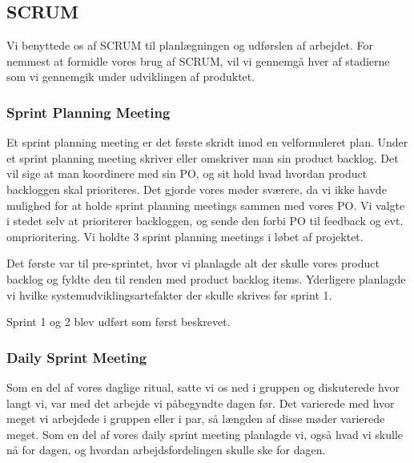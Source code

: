 \subsection{SCRUM}
Vi benyttede os af SCRUM til planlægningen og udførslen af arbejdet.
For nemmest at formidle vores brug af SCRUM, vil vi gennemgå hver af stadierne som vi gennemgik under udviklingen af produktet. 

\subsubsection{Sprint Planning Meeting}
Et sprint planning meeting er det første skridt imod en velformuleret plan.
 Under et sprint planning meeting skriver eller omskriver man sin product backlog.
  Det vil sige at man koordinere med sin PO, og sit hold hvad hvordan product backloggen skal prioriteres.
   Det gjorde vores møder sværere, da vi ikke havde mulighed for at holde sprint planning meetings sammen med vores PO.
    Vi valgte i stedet selv at prioriterer backloggen, og sende den forbi PO til feedback og evt. omprioritering.
     Vi holdte 3 sprint planning meetings i løbet af projektet. 

Det første var til pre-sprintet, hvor vi planlagde alt der skulle vores product backlog og fyldte den til renden med product backlog items.
 Yderligere planlagde vi hvilke systemudviklingsartefakter der skulle skrives før sprint 1.

Sprint 1 og 2 blev udført som først beskrevet.

\subsubsection{Daily Sprint Meeting}
Som en del af vores daglige ritual, satte vi os ned i gruppen og diskuterede hvor langt vi, var med det arbejde vi påbegyndte dagen før.
 Det varierede med hvor meget vi arbejdede i gruppen eller i par, så længden af disse møder varierede meget.
  Som en del af vores daily sprint meeting planlagde vi, også hvad vi skulle nå for dagen, og hvordan arbejdsfordelingen skulle ske for dagen.
  